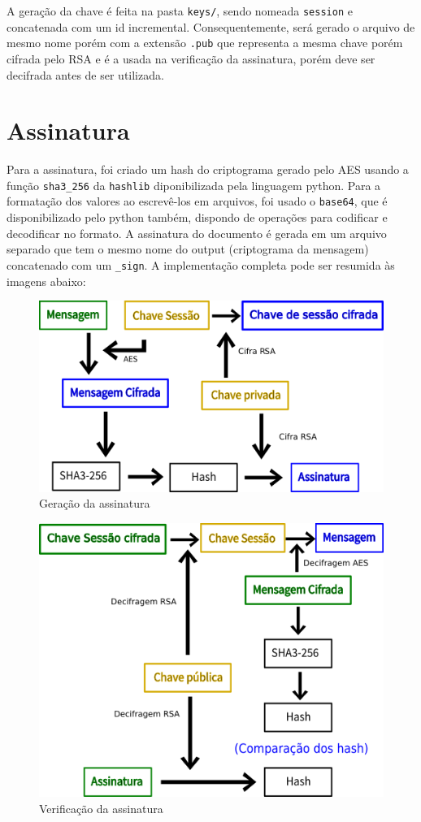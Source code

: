 \documentclass[12pt]{article}
\begin{document}
A geração da chave é feita na pasta \texttt{keys/}, sendo nomeada \texttt{session} e concatenada com um id incremental. Consequentemente, será gerado o arquivo de mesmo nome porém com a extensão \texttt{.pub} que representa a mesma chave porém cifrada pelo RSA e é a usada na verificação da assinatura, porém deve ser decifrada antes de ser utilizada. 

\section{Assinatura}

Para a assinatura, foi criado um hash do criptograma gerado pelo AES usando a função \texttt{sha3\_256} da \texttt{hashlib} diponibilizada pela linguagem python. Para a formatação dos valores ao escrevê-los em arquivos, foi usado o \texttt{base64}, que é disponibilizado pelo python também, dispondo de operações para codificar e decodificar no formato. A assinatura do documento é gerada em um arquivo separado que tem o mesmo nome do output (criptograma da mensagem) concatenado com um \texttt{\_sign}. A implementação completa pode ser resumida às imagens abaixo:

\begin{figure}[H]
	\centering
    \includegraphics[width=.65\textwidth]{img/assinatura.png}
    \caption{Geração da assinatura}
\end{figure}

\begin{figure}[H]
	\centering
    \includegraphics[width=.65\textwidth]{img/verificacao.png}
    \caption{Verificação da assinatura}
\end{figure}
\end{document}
